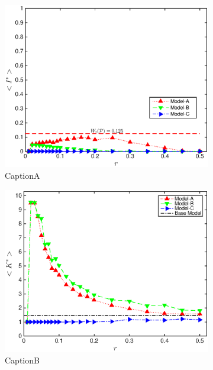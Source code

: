 \documentclass[pre,twocolumn,showkeys,longbibliography]{revtex4-1}
\theoremstyle{plain}
\theoremstyle{definition}
\theoremstyle{remark}
\begin{document}
\begin{figure}[!tbp]
	\begin{subfigure}{\columnwidth}%
		\includegraphics[width=\columnwidth]
			{Fig-FigureA}
		\caption{CaptionA} 
		\label{fig:figureA}
	\end{subfigure}
	\begin{subfigure}{\columnwidth}%
		\includegraphics[width=\columnwidth]
			{Fig-FigureB}
		\caption{CaptionB} 
		\label{fig:figureB}
	\end{subfigure}\\
	\begin{subfigure}{\columnwidth}%

\end{subfigure}
\end{figure}
\end{document}

